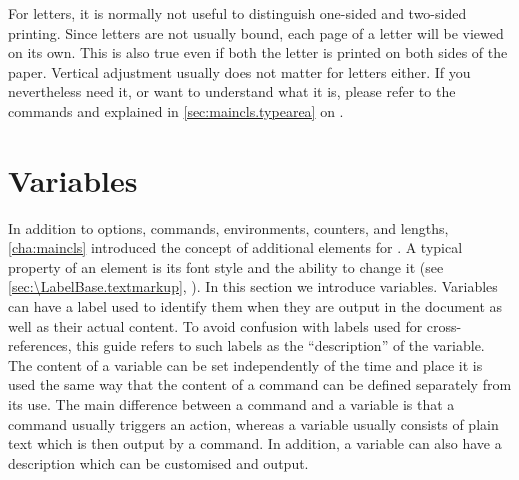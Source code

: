 

For letters, it is normally not useful to distinguish one-sided and two-sided
printing. Since letters are not usually bound, each page of a letter will be
viewed on its own. This is also true even if both the letter is printed on
both sides of the paper. Vertical adjustment usually does not matter for
letters either. If you nevertheless need it, or want to understand what it is,
please refer to the commands
 and
 explained in
\autoref{sec:maincls.typearea} on .%
%
\EndIndexGroup


\section{Variables}
%
\BeginIndexGroup
{}

In addition to options, commands, environments, counters, and lengths,
\autoref{cha:maincls} introduced the concept of additional elements for
\KOMAScript{}. A typical property of an element is its font style and the
ability to change it (see \autoref{sec:\LabelBase.textmarkup},
). In this section we introduce
variables. Variables can have a label used to identify them when they are
output in the document as well as their actual content. To avoid confusion
with labels used for cross-references, this guide refers to such labels as the
``description'' of the variable. The content of a variable can be set
independently of the time and place it is used the same way that the content
of a command can be defined separately from its use. The main difference
between a command and a variable is that a command usually triggers an action,
whereas a variable usually consists of plain text which is then output by a
command. In addition, a variable can also have a description which can be
customised and output.

